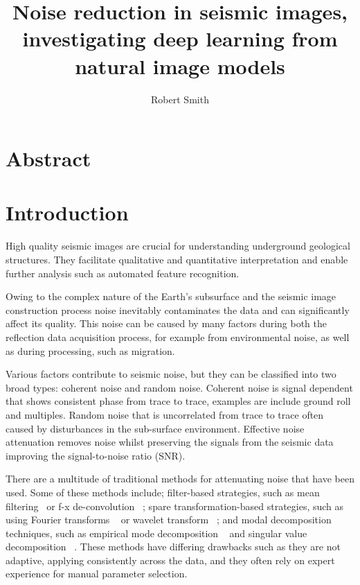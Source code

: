\documentclass[project-plan]{report-template}
\title{Noise reduction in seismic images, investigating deep learning from natural image models}
\author{Robert Smith}
\begin{document}
\maketitlepage  %

\section*{Abstract}
\blindtext  %

\newpage
\tableofcontents
\newpage

\section{Introduction}
High quality seismic images are crucial for understanding underground geological structures. They facilitate qualitative and quantitative interpretation and enable further analysis such as automated feature recognition.

Owing to the complex nature of the Earth's subsurface and the seismic image construction process noise inevitably contaminates the data and can significantly affect its quality. This noise can be caused by many factors during both the reflection data acquisition process, for example from environmental noise, as well as during processing, such as migration. 

Various factors contribute to seismic noise, but they can be classified into two broad types: coherent noise and random noise. Coherent noise is signal dependent that shows consistent phase from trace to trace, examples are include ground roll and multiples. Random noise that is uncorrelated from trace to trace often caused by disturbances in the sub-surface environment. Effective noise attenuation removes noise whilst preserving the signals from the seismic data improving the signal-to-noise ratio (SNR).

There are a multitude of traditional methods for attenuating noise that have been used. Some of these methods include; filter-based strategies, such as mean filtering~\cite{Liu20062d} or f-x de-convolution ~\cite{hornbostel1991spatial}; spare transformation-based strategies, such as using Fourier transforms ~\cite{alsdorf1997noise} or wavelet transform ~\cite{Albert2009wavelet}; and modal decomposition techniques, such as empirical mode decomposition ~\cite{bekara2009random} and singular value decomposition ~\cite{bekara2007local}. These methods have differing drawbacks such as they are not adaptive, applying consistently across the data, and they often rely on expert experience for manual parameter selection.
\end{document}
